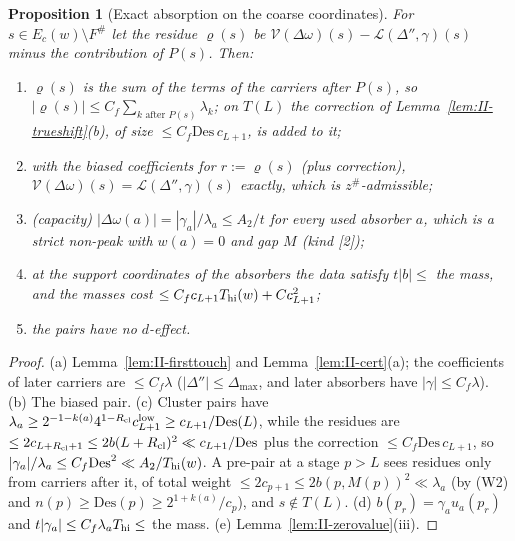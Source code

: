 \documentclass[10pt]{amsart}
\newtheorem{proposition}[theorem]{Proposition}
\theoremstyle{definition}
\theoremstyle{remark}
\begin{document}
\begin{proposition}[Exact absorption on the coarse coordinates]\label{prop:II-absorb}
For $s\in E_c(w)\setminus F^\#$ let the residue $\varrho(s)$ be $\mathcal V(\Delta\omega)(s)-\mathcal L(\Delta'',
\gamma)(s)$ minus the contribution of $P(s)$.  Then:
\begin{enumerate}
\item[(a)] $\varrho(s)$ is the sum of the terms of the carriers after $P(s)$, so $|\varrho(s)|\le
C_f\sum_{k\text{ after }P(s)}\lambda_k$; on $T(L)$ the correction of
Lemma~\textup{\ref{lem:II-trueshift}(b)}, of size $\le C_f\mathrm{Des}\,c_{L+1}$, is added to
it;
\item[(b)] with the biased coefficients for $r:=\varrho(s)$ \textup{(}plus correction\textup{)},
$\mathcal V(\Delta\omega)(s)=\mathcal L(\Delta'',\gamma)(s)$ exactly, which is $z^\#$-admissible;
\item[(c)] \textup{(capacity)} $|\Delta\omega(a)|=|\gamma_a|/\lambda_a\le A_2/t$ for every used
absorber $a$, which is a strict non-peak with $w(a)=0$ and gap $M$ (kind
\textup{[2]});
\item[(d)] at the support coordinates of the absorbers the data satisfy $t|b|\le$
the mass, and the masses cost $\le C_fc_{L+1}T_{\rm hi}(w)+Cc_{L+1}^2$;
\item[(e)] the pairs have no $d$-effect.
\end{enumerate}
\end{proposition}

\begin{proof}
(a) Lemma~\ref{lem:II-firsttouch} and Lemma~\ref{lem:II-cert}(a); the coefficients of
later carriers are $\le C_f\lambda$ ($|\Delta''|\le\Delta_{\max}$, and later absorbers have
$|\gamma|\le C_f\lambda$).  (b) The biased pair.  (c) Cluster pairs have $\lambda_a\ge2^{-1-
k(a)}4^{1-R_{\rm cl}}c^{\rm low}_{L+1}\ge c_{L+1}/\mathrm{Des}(L)$, while the residues are $\le
2c_{L+R_{\rm cl}+1}\le2b(L+R_{\rm cl})^2\ll c_{L+1}/\mathrm{Des}$ plus the correction $\le
C_f\mathrm{Des}\,c_{L+1}$, so $|\gamma_a|/\lambda_a\le C_f\mathrm{Des}^2\ll A_2/T_{\rm hi}(w)$.  A pre-pair
at a stage $p>L$ sees residues only from carriers after it, of total weight
$\le2c_{p+1}\le2b(p,M(p))^2\ll\lambda_a$ (by (W2) and $n(p)\ge\mathrm{Des}(p)\ge2^{1+k(a)}/
c_p$), and $s\notin T(L)$.  (d) $b(p_r)=\gamma_au_a(p_r)$ and $t|\gamma_a|\le C_f\lambda_aT_{\rm hi}\le$
the mass.  (e) Lemma~\ref{lem:II-zerovalue}(iii).
\end{proof}
\end{document}
